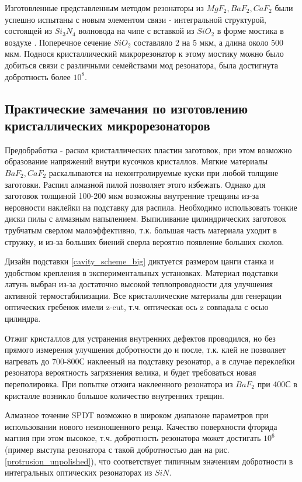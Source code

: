 Изготовленные представленным методом резонаторы из $MgF_2,BaF_2,CaF_2$ были успешно испытаны с новым элементом связи - интегральной структурой, состоящей из $Si_3N_4$ волновода на чипе с вставкой из $SiO_2$ в форме мостика в воздухе \cite{Anderson:18}. Поперечное сечение $SiO_2$ составляло 2 на 5 мкм, а длина около 500 мкм. Поднося кристаллический микрорезонатор к этому мостику можно было добиться связи с различными семействами мод резонатора, была достигнута добротность более $10^8$.

\subsection{Практические замечания по изготовлению кристаллических микрорезонаторов}

Предобработка - раскол кристаллических пластин заготовок, при этом возможно образование напряжений внутри кусочков кристаллов. Мягкие материалы $BaF_2, CaF_2$ раскалываются на неконтролируемые куски при любой толщине заготовки. Распил алмазной пилой позволяет этого избежать. Однако для заготовок толщиной 100-200 мкм возможны внутренние трещины из-за неровности наклейки на подставку для распила. Необходимо использовать тонкие диски пилы с алмазным напылением. Выпиливание цилиндрических заготовок трубчатым сверлом малоэффективно, т.к. большая часть материала уходит в стружку, и из-за больших биений сверла вероятно появление больших сколов.

Дизайн подставки \ref{cavity_scheme_big} диктуется размером цанги станка и удобством крепления в экспериментальных установках. Материал подставки латунь выбран из-за достаточно высокой теплопроводности для улучшения активной термостабилизации. Все кристаллические материалы для генерации оптических гребенок имели z-cut, т.ч. оптическая ось z совпадала с осью цилиндра.

Отжиг кристаллов для устранения внутренних дефектов проводился, но без прямого измерения улучшения добротности до и после, т.к. клей не позволяет нагревать до 700-800С наклееный на подставку резонатор, а в случае переклейки резонатора вероятность загрязнения велика, и будет требоваться новая переполировка. При попытке отжига наклеенного резонатора из $BaF_2$ при 400С в кристалле возникло большое количество внутренних трещин.

Алмазное точение SPDT возможно в широком диапазоне параметров при использовании нового неизношенного резца. Качество поверхности фторида магния при этом высокое, т.ч. добротность резонатора может достигать $10^6$ (пример выступа резонатора с такой добротностью дан на рис. \ref{protrusion_unpolished}), что соответствует типичным значениям добротности в интегральных оптических резонаторах из $SiN$.

